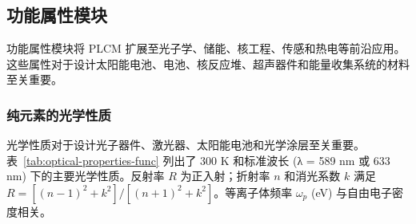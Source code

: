\documentclass[12pt,a4paper]{article}
\begin{document}
	\subsection{功能属性模块}
	\label{subsec:functional-properties}
	
	功能属性模块将 PLCM 扩展至光子学、储能、核工程、传感和热电等前沿应用。这些属性对于设计太阳能电池、电池、核反应堆、超声器件和能量收集系统的材料至关重要。
	
	\subsubsection{纯元素的光学性质}
	\label{subsec:optical-properties}
	
	光学性质对于设计光子器件、激光器、太阳能电池和光学涂层至关重要。表~\ref{tab:optical-properties-func} 列出了 300 K 和标准波长 (λ = 589 nm 或 633 nm) 下的主要光学性质。反射率 \(R\) 为正入射；折射率 \(n\) 和消光系数 \(k\) 满足 \(R = [(n-1)^2 + k^2]/[(n+1)^2 + k^2]\)。等离子体频率 \(\omega_p\) (eV) 与自由电子密度相关。
	
\end{document}
